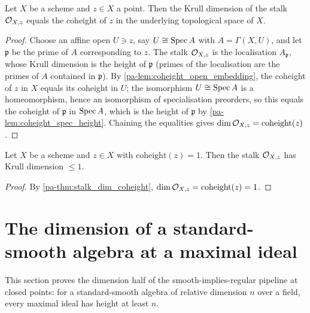 \begin{theorem}
  \label{pa-thm:stalk_dim_coheight}
  \leanok

  Let \(X\) be a scheme and \(z \in X\) a point. Then the Krull dimension of the stalk
  \(\mathcal{O}_{X,z}\) equals the coheight of \(z\) in the underlying topological space of
  \(X\).
\end{theorem}
\begin{proof}
  \leanok
  Choose an affine open \(U \ni z\), say \(U \cong \operatorname{Spec} A\) with
  \(A = \Gamma(X, U)\), and let \(\mathfrak p\) be the prime of \(A\) corresponding to
  \(z\). The stalk \(\mathcal{O}_{X,z}\) is the localisation \(A_{\mathfrak p}\), whose Krull
  dimension is the height of \(\mathfrak p\) (primes of the localisation are the primes
  of \(A\) contained in \(\mathfrak p\)). By \ref{pa-lem:coheight_open_embedding}, the
  coheight of \(z\) in \(X\) equals its coheight in \(U\); the isomorphism
  \(U \cong \operatorname{Spec} A\) is a homeomorphism, hence an isomorphism of specialisation
  preorders, so this equals the coheight of \(\mathfrak p\) in \(\operatorname{Spec} A\), which is the
  height of \(\mathfrak p\) by \ref{pa-lem:coheight_spec_height}. Chaining the equalities
  gives \(\dim \mathcal{O}_{X,z} = \mathrm{coheight}(z)\).
\end{proof}

\begin{lemma}
  \label{pa-lem:stalk_dimLE_one}
  \leanok

  Let \(X\) be a scheme and \(z \in X\) with \(\mathrm{coheight}(z) = 1\). Then the
  stalk \(\mathcal{O}_{X,z}\) has Krull dimension \(\leq 1\).
\end{lemma}
\begin{proof}
  \leanok
  By \ref{pa-thm:stalk_dim_coheight}, \(\dim \mathcal{O}_{X,z} = \mathrm{coheight}(z) = 1\).
\end{proof}

\section{The dimension of a standard-smooth algebra at a maximal ideal}
\label{pa-sec:standard_smooth_dimension}

This section proves the dimension half of the smooth-implies-regular pipeline at closed
points: for a standard-smooth algebra of relative dimension \(n\) over a field, every
maximal ideal has height at least \(n\).

